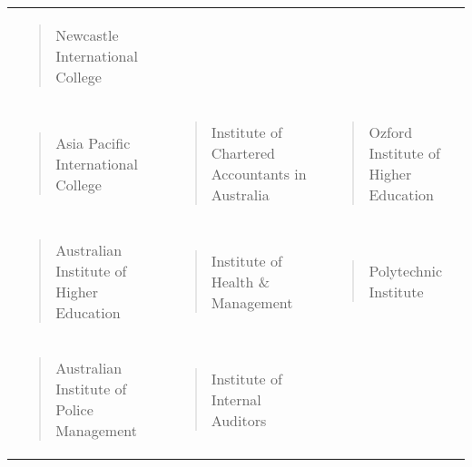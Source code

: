 \documentclass[]{book}
\begin{document}
\begin{longtable}[]{@{}lll@{}}
\begin{minipage}[t]{0.32\columnwidth}
\begin{quote}
Newcastle International College
\end{quote}\strut
\end{minipage}\tabularnewline
\begin{minipage}[t]{0.32\columnwidth}\raggedright
\begin{quote}
Asia Pacific International College
\end{quote}\strut
\end{minipage} & \begin{minipage}[t]{0.32\columnwidth}\raggedright
\begin{quote}
Institute of Chartered Accountants in Australia
\end{quote}\strut
\end{minipage} & \begin{minipage}[t]{0.32\columnwidth}\raggedright
\begin{quote}
Ozford Institute of Higher Education
\end{quote}\strut
\end{minipage}\tabularnewline
\begin{minipage}[t]{0.32\columnwidth}\raggedright
\begin{quote}
Australian Institute of Higher Education
\end{quote}\strut
\end{minipage} & \begin{minipage}[t]{0.32\columnwidth}\raggedright
\begin{quote}
Institute of Health \& Management
\end{quote}\strut
\end{minipage} & \begin{minipage}[t]{0.32\columnwidth}\raggedright
\begin{quote}
Polytechnic Institute
\end{quote}\strut
\end{minipage}\tabularnewline
\begin{minipage}[t]{0.32\columnwidth}\raggedright
\begin{quote}
Australian Institute of Police Management
\end{quote}\strut
\end{minipage} & \begin{minipage}[t]{0.32\columnwidth}\raggedright
\begin{quote}
Institute of Internal Auditors
\end{quote}\strut
\end{minipage} & \begin{minipage}[t]{0.32\columnwidth}\raggedright

\end{minipage}
\end{longtable}
\end{document}
